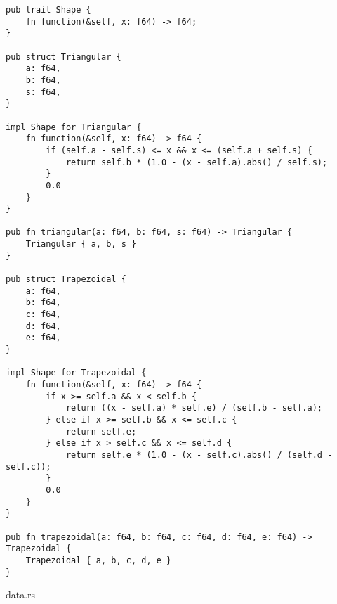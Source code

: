 \begin{verbatim}
pub trait Shape {
    fn function(&self, x: f64) -> f64;
}

pub struct Triangular {
    a: f64,
    b: f64,
    s: f64,
}

impl Shape for Triangular {
    fn function(&self, x: f64) -> f64 {
        if (self.a - self.s) <= x && x <= (self.a + self.s) {
            return self.b * (1.0 - (x - self.a).abs() / self.s);
        }
        0.0
    }
}

pub fn triangular(a: f64, b: f64, s: f64) -> Triangular {
    Triangular { a, b, s }
}

pub struct Trapezoidal {
    a: f64,
    b: f64,
    c: f64,
    d: f64,
    e: f64,
}

impl Shape for Trapezoidal {
    fn function(&self, x: f64) -> f64 {
        if x >= self.a && x < self.b {
            return ((x - self.a) * self.e) / (self.b - self.a);
        } else if x >= self.b && x <= self.c {
            return self.e;
        } else if x > self.c && x <= self.d {
            return self.e * (1.0 - (x - self.c).abs() / (self.d - self.c));
        }
        0.0
    }
}

pub fn trapezoidal(a: f64, b: f64, c: f64, d: f64, e: f64) -> Trapezoidal {
    Trapezoidal { a, b, c, d, e }
}

\end{verbatim}
\noindent data.rs
